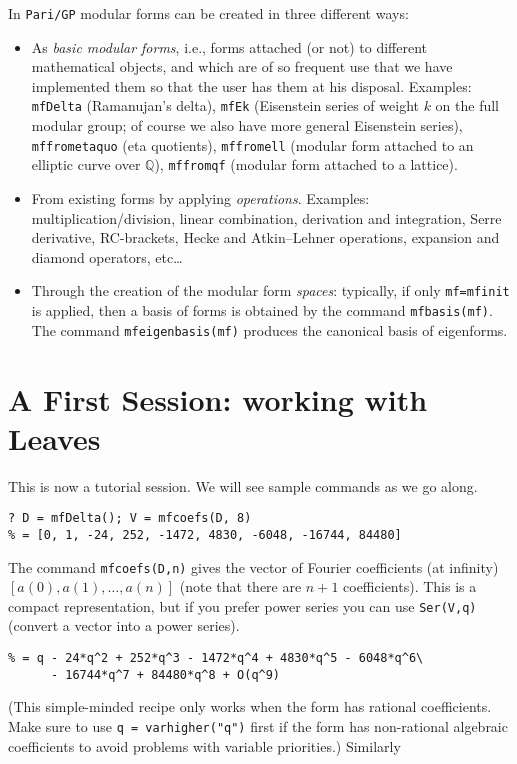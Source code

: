 \documentclass[11pt]{article}
\newcommand{\Q}{{\mathbb Q}}
\def\kbd#1{{\tt #1}}
\begin{document}
In \kbd{Pari/GP} modular forms can be created in three different ways:

\begin{itemize}\item As \emph{basic modular forms}, i.e., forms attached (or
  not) to different mathematical objects, and which are of so frequent use
  that we have implemented them so that the user has them at his disposal.
  Examples: \kbd{mfDelta} (Ramanujan's delta), \kbd{mfEk}
  (Eisenstein series of weight $k$ on the full modular group; of course
  we also have more general Eisenstein series), \kbd{mffrometaquo}
  (eta quotients), \kbd{mffromell} (modular form attached to an elliptic
  curve over $\Q$), \kbd{mffromqf} (modular form attached
  to a lattice).
\item From existing forms by applying \emph{operations}.
  Examples: multiplication/division, linear combination,
  derivation and integration, Serre derivative, RC-brackets, Hecke and
  Atkin--Lehner operations, expansion and diamond operators, etc\dots
\item Through the creation of the modular form \emph{spaces}:
  typically, if only \kbd{mf=mfinit} is applied, then a
  basis of forms is obtained by the command \kbd{mfbasis(mf)}.
  The command \kbd{mfeigenbasis(mf)} produces the canonical basis of
  eigenforms.\end{itemize}

\section{A First Session: working with Leaves}

This is now a tutorial session. We will see sample commands as we go along.

\begin{verbatim}
? D = mfDelta(); V = mfcoefs(D, 8)
% = [0, 1, -24, 252, -1472, 4830, -6048, -16744, 84480]
\end{verbatim}

The command \kbd{mfcoefs(D,n)} gives the vector of Fourier coefficients (at
infinity) $[a(0),a(1),\dots,a(n)]$ (note that there are $n+1$ coefficients).
This is a compact representation, but if you prefer power series you
can use \kbd{Ser(V,q)} (convert a vector into a power series).

\begin{verbatim}
% = q - 24*q^2 + 252*q^3 - 1472*q^4 + 4830*q^5 - 6048*q^6\
      - 16744*q^7 + 84480*q^8 + O(q^9)
\end{verbatim}
(This simple-minded recipe only works when the form has rational
coefficients. Make sure to use \kbd{q = varhigher("q")} first if the form has
non-rational algebraic coefficients to avoid problems with variable priorities.)
Similarly
\end{document}
